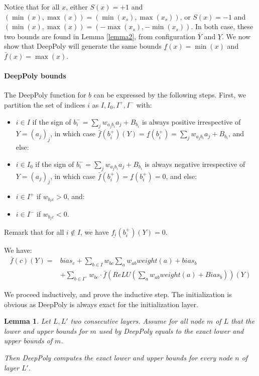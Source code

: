 \documentclass[]{article}
\newtheorem{lemma}{Lemma}
\theoremstyle{definition}
\begin{document}
Notice that for all $x$, either $S(x)=+1$ and 
$(\min(x),\max(x))=(\min(x_s),\max(x_s))$, 
or $S(x)=-1$ and $(\min(x),\max(x))=(-\max(x_s),-\min(x_s))$.
In both case, these two bounds are found in Lemma \ref{lemma2},
from configuration $\bar{Y}$ and $\underline{Y}$.
We now show that DeepPoly will generate the same bounds 
$\underline{f}(x)=\min(x)$ and $\bar{f}(x)=\max(x)$.

\paragraph{DeepPoly bounds}

The DeepPoly function for $b$ can be expressed by the following steps.
First, we partition the set of indices $i$ as $I,I_0,I^+,I^-$ with:
\begin{itemize}
	\item $i \in I$ if the sign of $b_i^-=\sum_{j} w_{a_j b_i} a_j + B_{b_i}$ is always positive irrespective of $Y=(a_j)_j$, in which case 
	$\bar{f}(b_i^+)(Y)=\underline{f}(b_i^+)=\sum_{j} w_{a_j b_i} a_j + B_{b_i}$, and else:
	\item $i \in I_0$ if the sign of $b_i^-=\sum_{j} w_{a_j b_i} a_j + B_{b_i}$ is always negative irrespective of $Y=(a_j)_j$, in which case $\bar{f}(b_i^+)=\underline{f}(b_i^+)=0$,	and else:
	\item $i \in I^+$ if $w_{b_i c}>0$, and:
	\item $i \in I^-$ if $w_{b_i c}<0$.
	\end{itemize}
	
Remark that for all $i \notin I$, we have $\underline{f_i}(b_i^+)(Y)=0$.
	

We have:
\begin{align*}
	\bar{f}(c)(Y) = &
	bias_c + \sum_{b \in I} w_{bc}\sum_{a} w_{a b} weight(a) + bias_{b} \\
	& + \sum_{b \in I^+} w_{b c} \cdot \bar{f}(ReLU(\sum_{a} w_{a b} weight(a) 
	+ Bias_{b}))(Y) 
	\end{align*}



We proceed inductively, and prove the inductive step.
The initialization is obvious as DeepPoly is always exact for the initialization layer.

\begin{lemma}
	Let $L,L'$ two consecutive layers.
	Assume for all node $m$ of $L$ that the lower and upper bounds for $m$ used by DeepPoly equals to the exact lower and upper bounds of $m$.
	
	Then DeepPoly computes the exact lower and upper bounds for every node $n$ of layer $L'$.
\end{lemma}
\end{document}
